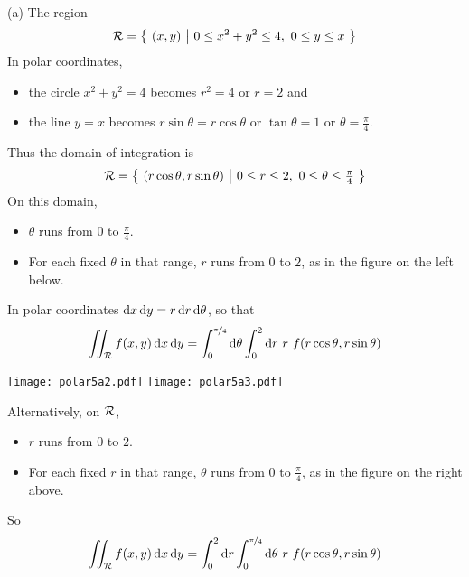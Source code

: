 \begin{solution}
(a) The region 
\begin{equation*}
\mathcal{R}=\big\{ \ (x,y)\ \big|\ 0\le x^2+y^2\le 4,\ 0\le y\le x\ \big\}
\end{equation*}
In polar coordinates, 
\begin{itemize}
\item
the circle $x^2+y^2=4$ becomes $r^2=4$ or $r=2$ and 
\item
the line $y=x$ becomes $r\sin\theta=r\cos\theta$ or $\tan\theta=1$ 
or $\theta=\frac{\pi}{4}$. 
\end{itemize}
Thus the domain of integration is
\begin{equation*}
\cR=\Set{(r\cos\theta,r\sin\theta)}{0\le r\le 2,\ 0\le\theta\le\tfrac{\pi}{4}}
\end{equation*}
On this domain,
\begin{itemize}
\item 
$\theta$ runs from $0$ to $\frac{\pi}{4}$. 
\item
For each fixed $\theta$ in that range, $r$ runs from $0$ to $2$, 
as in the figure on the left below.
\end{itemize}
In polar coordinates $\mathrm{d}x\,\mathrm{d}y = r\,\mathrm{d}r\,\mathrm{d}\theta$, so that
\begin{equation*}
\iint_{\mathcal{R}} f(x,y)\,\mathrm{d}x\,\mathrm{d}y
=\int_0^{\nicefrac{\pi}{4}}\mathrm{d}\theta
 \int_0^2\mathrm{d}r\ r\ f(r\cos\theta,r\sin\theta)
\end{equation*}
\begin{center}
     \texttt{[image: polar5a2.pdf]}\qquad\qquad
     \texttt{[image: polar5a3.pdf]}
\end{center}
Alternatively, on $\mathcal{R}$,
\begin{itemize}
\item 
$r$ runs from $0$ to $2$. 
\item
For each fixed $r$ in that range, $\theta$ runs from $0$ to $\frac{\pi}{4}$,
as in the figure on the right above.
\end{itemize}
So 
\begin{equation*}
\iint_{\mathcal{R}} f(x,y)\,\mathrm{d}x\,\mathrm{d}y
=\int_0^2\mathrm{d}r
  \int_0^{\nicefrac{\pi}{4}}\mathrm{d}\theta
 \ r\ f(r\cos\theta,r\sin\theta)
\end{equation*}



\end{solution}
